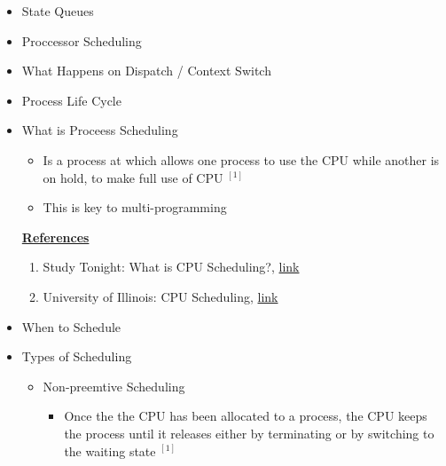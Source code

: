 \documentclass[12pt]{article}
\begin{document}
\begin{itemize}
    \item State Queues
    \item Proccessor Scheduling
    \item What Happens on Dispatch / Context Switch
    \item Process Life Cycle
    \item What is Proceess Scheduling
    \begin{itemize}
        \item Is a process at which allows one process to use the CPU while
        another is on hold, to make full use of CPU $^{[1]}$
        \item This is key to multi-programming
    \end{itemize}

    \bigskip

    \underline{\textbf{References}}

    \bigskip

    \begin{enumerate}[1)]
        \item Study Tonight: What is CPU Scheduling?, \href{https://www.studytonight.com/operating-system/cpu-scheduling}{link}
        \item University of Illinois: CPU Scheduling, \href{https://www.cs.uic.edu/~jbell/CourseNotes/OperatingSystems/6_CPU_Scheduling.html}{link}
    \end{enumerate}

    \item When to Schedule
    \item Types of Scheduling
    \begin{itemize}
        \item Non-preemtive Scheduling
        \begin{itemize}
            \item Once the the CPU has been allocated to a process, the CPU
            keeps the process until it releases either by terminating or by switching
            to the waiting state $^{[1]}$


\end{itemize}
\end{itemize}
\end{itemize}
\end{document}
